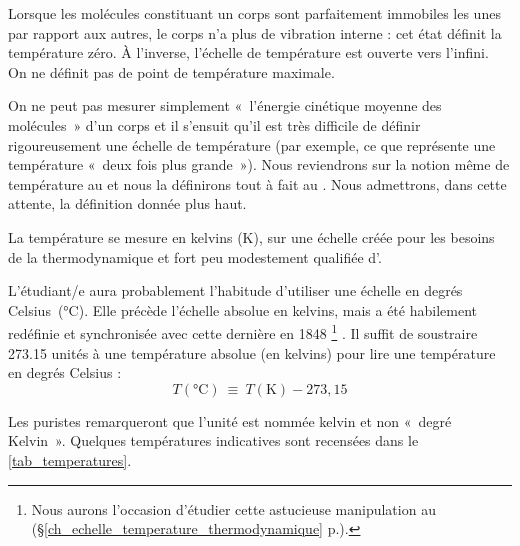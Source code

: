 		Lorsque les molécules constituant un corps sont parfaitement immobiles les unes par rapport aux autres, le corps n’a plus de vibration interne : cet état définit la température zéro. À l’inverse, l’échelle de température est ouverte vers l’infini. On ne définit pas de point de température maximale.

		On ne peut pas mesurer simplement «~l’énergie cinétique moyenne des molécules~» d’un corps et il s'ensuit qu’il est très difficile de définir rigoureusement une échelle de température (par exemple, ce que représente une température «~deux fois plus grande~»). Nous reviendrons sur la notion même de température au \coursquatre et nous la définirons tout à fait au \courssept. Nous admettrons, dans cette attente, la définition donnée plus haut.

		La température se mesure en \si{kelvins} (\si{\kelvin}), sur une échelle créée pour les besoins de la thermodynamique et fort peu modestement qualifiée d’.

		L’étudiant/e aura probablement l’habitude d’utiliser une échelle en \si{degrés} \si{Celsius}~(\si{\degreeCelsius}). Elle précède l’échelle absolue en \si{kelvins}, mais a été habilement redéfinie et synchronisée avec cette dernière en 1848%
			\footnote{Nous aurons l’occasion d’étudier cette astucieuse manipulation au \courssept (\S\ref{ch_echelle_temperature_thermodynamique} p.\pageref{ch_echelle_temperature_thermodynamique}).}%
		. Il suffit de soustraire \num{273,15} unités à une température absolue (en \si{kelvins}) pour lire une température en \si{degrés} \si{Celsius} :
		\begin{equation}
			T(\si{\degreeCelsius})\ \equiv \ T(\si{\kelvin}) - 273,15
			\label{def_température_kelvins_celsius}
		\end{equation}

		Les puristes remarqueront que l’unité est nommée \si{kelvin} et non «~degré Kelvin~». Quelques températures indicatives sont recensées dans le \cref{tab_temperatures}.

